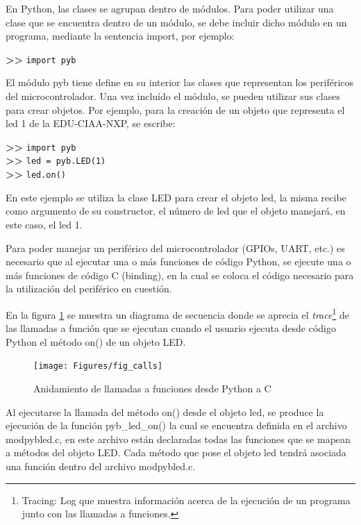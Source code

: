 En Python, las clases se agrupan dentro de módulos. Para poder utilizar una clase que se encuentra dentro de un módulo, se debe incluir dicho módulo en un programa, mediante la sentencia import, por ejemplo:

\textbf{{\fontsize{16}{16}\selectfont \textgreater\textgreater}} \texttt{import pyb}

El módulo pyb tiene define en su interior las clases que representan los periféricos del microcontrolador. Una vez incluído el módulo, se pueden utilizar sus clases para crear objetos.
Por ejemplo, para la creación de un objeto que representa el led 1 de la EDU-CIAA-NXP, se escribe:

\textbf{{\fontsize{16}{16}\selectfont \textgreater\textgreater}} \texttt{import pyb}\\
\textbf{{\fontsize{16}{16}\selectfont \textgreater\textgreater}} \texttt{led = pyb.LED(1)}\\
\textbf{{\fontsize{16}{16}\selectfont \textgreater\textgreater}} \texttt{led.on()}

En este ejemplo se utiliza la clase LED para crear el objeto led, la misma recibe como argumento de su constructor, el número de led que el objeto manejará, en este caso, el led 1.

Para poder manejar un periférico del microcontrolador (GPIOs, UART, etc.) es necesario que al ejecutar una o más funciones de código Python, se ejecute una o más funciones de código C (binding), en la cual se coloca el código necesario para la utilización del periférico en cuestión.

En la figura \ref{fig:calls} se muestra un diagrama de secuencia donde se aprecia el \textit{trace}\footnote{Tracing: Log que muestra información acerca de la ejecución de un programa junto con las llamadas a funciones.} de las llamadas a función que se ejecutan cuando el usuario ejecuta desde código Python el método on() de un objeto LED.

\begin{figure}[ht]
  \centering
    \texttt{[image: Figures/fig\_calls]}
  \caption{Anidamiento de llamadas a funciones desde Python a C}
  \label{fig:calls}
\end{figure}

Al ejecutarse la llamada del método on() desde el objeto led, se produce la ejecución de la función pyb\_led\_on() la cual se encuentra definida en el archivo modpybled.c, en este archivo están declaradas todas las funciones que se mapean a métodos del objeto LED. Cada método que pose el objeto led tendrá asociada una función dentro del archivo modpybled.c.

